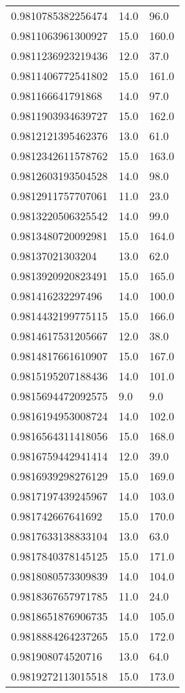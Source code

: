 \begin{center}
\begin{supertabular}[H]{p{0.30\textwidth}p{0.05\textwidth}p{0.05\textwidth}}
0.9810785382256474 & 14.0 & 96.0 \\ 
0.9811063961300927 & 15.0 & 160.0 \\ 
0.9811236923219436 & 12.0 & 37.0 \\ 
0.9811406772541802 & 15.0 & 161.0 \\ 
0.981166641791868 & 14.0 & 97.0 \\ 
0.9811903934639727 & 15.0 & 162.0 \\ 
0.9812121395462376 & 13.0 & 61.0 \\ 
0.9812342611578762 & 15.0 & 163.0 \\ 
0.9812603193504528 & 14.0 & 98.0 \\ 
0.9812911757707061 & 11.0 & 23.0 \\ 
0.9813220506325542 & 14.0 & 99.0 \\ 
0.9813480720092981 & 15.0 & 164.0 \\ 
0.98137021303204 & 13.0 & 62.0 \\ 
0.9813920920823491 & 15.0 & 165.0 \\ 
0.981416232297496 & 14.0 & 100.0 \\ 
0.9814432199775115 & 15.0 & 166.0 \\ 
0.9814617531205667 & 12.0 & 38.0 \\ 
0.9814817661610907 & 15.0 & 167.0 \\ 
0.9815195207188436 & 14.0 & 101.0 \\ 
0.9815694472092575 & 9.0 & 9.0 \\ 
0.9816194953008724 & 14.0 & 102.0 \\ 
0.9816564311418056 & 15.0 & 168.0 \\ 
0.9816759442941414 & 12.0 & 39.0 \\ 
0.9816939298276129 & 15.0 & 169.0 \\ 
0.9817197439245967 & 14.0 & 103.0 \\ 
0.981742667641692 & 15.0 & 170.0 \\ 
0.9817633138833104 & 13.0 & 63.0 \\ 
0.9817840378145125 & 15.0 & 171.0 \\ 
0.9818080573309839 & 14.0 & 104.0 \\ 
0.9818367657971785 & 11.0 & 24.0 \\ 
0.9818651876906735 & 14.0 & 105.0 \\ 
0.9818884264237265 & 15.0 & 172.0 \\ 
0.981908074520716 & 13.0 & 64.0 \\ 
0.9819272113015518 & 15.0 & 173.0 \\ 

\end{supertabular}
\end{center}
